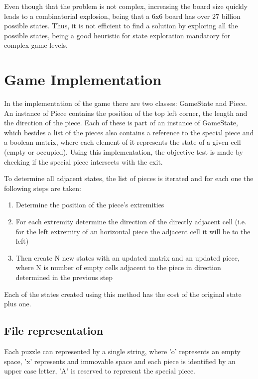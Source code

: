 \documentclass[conference]{IEEEtran}
\begin{document}
Even though that the problem is not complex, increasing the board size quickly leads to a combinatorial explosion, being that a 6x6 board has over 27 billion possible states. Thus, it is not efficient to find a solution by exploring all the possible states, being a good heuristic for state exploration mandatory for complex game levels.

\section{Game Implementation}

In the implementation of the game there are two classes: GameState and Piece. An instance of Piece contains the position of the top left corner, the length and the direction of the piece. Each of these is part of an instance of GameState, which besides a list of the pieces also contains a reference to the special piece and a boolean matrix, where each element of it represents the state of a given cell (empty or occupied). Using this implementation, the objective test is made by checking if the special piece intersects with the exit.

To determine all adjacent states, the list of pieces is iterated and for each one the following steps are taken:

\begin{enumerate}
    \item Determine the position of the piece's extremities
    \item For each extremity determine the direction of the directly adjacent cell (i.e. for the left extremity of an horizontal piece the adjacent cell it will be to the left)
    \item Then create N new states with an updated matrix and an updated piece, where N is number of empty cells adjacent to the piece in direction determined in the previous step
\end{enumerate}

Each of the states created using this method has the cost of the original state plus one.

\subsection{File representation}

Each puzzle can represented by a single string, where 'o' represents an empty space, 'x' represents and immovable space and each piece is identified by an upper case letter, 'A' is reserved to represent the special piece.
\end{document}
